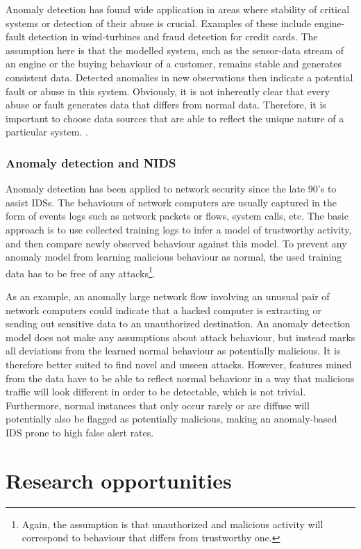 \documentclass[a4paper,12pt,twoside]{report}
\begin{document}
Anomaly detection has found wide application in areas where stability of  critical systems or detection of their abuse is crucial. Examples of these include engine-fault detection in wind-turbines and fraud detection for credit cards. The assumption here is that the modelled system, such as the sensor-data stream of an engine or the buying behaviour of a customer, remains stable and generates consistent data. Detected anomalies in new observations then indicate a potential fault or abuse in this system. Obviously, it is not inherently clear that every abuse or fault generates data that differs from normal data. Therefore, it is important to choose data sources that are able to reflect the unique nature of a particular system. .

\subsubsection{Anomaly detection and NIDS}

Anomaly detection has been applied to network security since the late 90's to assist IDSs. The behaviours of network computers are usually captured in the form of events logs such as network packets or flows, system calls, etc. The basic approach is to use collected training logs to infer a model of trustworthy activity, and then compare newly observed behaviour against this model.  To prevent any anomaly model from learning malicious behaviour as normal, the used training data has to be free of any attacks\footnote{Again, the assumption is that unauthorized and malicious activity will correspond to behaviour that differs from trustworthy one.}. 

As an example, an anomally large network flow involving an unusual pair of network computers could indicate that a hacked computer is extracting or sending out sensitive data to an unauthorized destination. An anomaly detection model does not make any assumptions about attack behaviour, but instead marks all deviations from the learned normal behaviour as potentially malicious. It is therefore better suited to find novel and unseen attacks. However, features mined from the data have to be able to reflect normal behaviour in a way that malicious traffic will look different in order to be detectable, which is not trivial. Furthermore, normal instances that only occur rarely or are diffuse will potentially also be flagged as potentially malicious, making an anomaly-based IDS prone to high false alert rates.

\section{Research opportunities}
\end{document}
